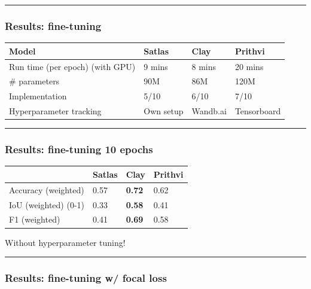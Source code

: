 \documentclass[
  letterpaper,
  DIV=11,
  numbers=noendperiod]{scrartcl}
\begin{document}
\begin{center}\rule{0.5\linewidth}{0.5pt}\end{center}

\subsubsection{Results: fine-tuning}\label{results-fine-tuning}

\begin{longtable}[]{@{}llll@{}}
\toprule\noalign{}
Model & Satlas & Clay & Prithvi \\
\midrule\noalign{}
\endhead
\bottomrule\noalign{}
\endlastfoot
Run time (per epoch) (with GPU) & 9 mins & 8 mins & 20 mins \\
\# parameters & 90M & 86M & 120M \\
Implementation & 5/10 & 6/10 & 7/10 \\
Hyperparameter tracking & Own setup & Wandb.ai & Tensorboard \\
\end{longtable}

\begin{center}\rule{0.5\linewidth}{0.5pt}\end{center}

\subsubsection{Results: fine-tuning 10
epochs}\label{results-fine-tuning-10-epochs}

\begin{longtable}[]{@{}llll@{}}
\toprule\noalign{}
& Satlas & Clay & Prithvi \\
\midrule\noalign{}
\endhead
\bottomrule\noalign{}
\endlastfoot
Accuracy (weighted) & 0.57 & \textbf{0.72} & 0.62 \\
IoU (weighted) (0-1) & 0.33 & \textbf{0.58} & 0.41 \\
F1 (weighted) & 0.41 & \textbf{0.69} & 0.58 \\
\end{longtable}

Without hyperparameter tuning!

\begin{center}\rule{0.5\linewidth}{0.5pt}\end{center}

\subsubsection{Results: fine-tuning w/ focal
loss}\label{results-fine-tuning-w-focal-loss}
\end{document}
